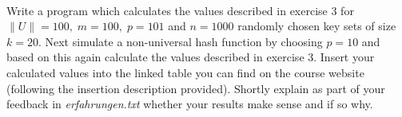  \\
Write a program which calculates the values described in exercise 3 for
$\|U\| = 100, \; m = 100, \; p = 101$ and $n = 1000$ randomly chosen key sets
of size $k = 20$.
Next simulate a non-universal hash function by choosing $p = 10$ and based on
this again calculate the values described in exercise 3.
Insert your calculated values into the linked table you can find on the course
website (following the insertion description provided).
Shortly explain as part of your feedback in \textit{erfahrungen.txt} whether
your results make sense and if so why.